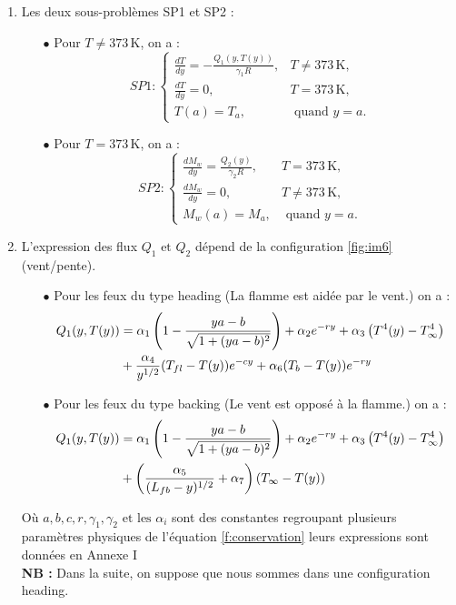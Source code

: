 \documentclass[12pt, oneside]{report} %
\theoremstyle{definition}
\theoremstyle{remark}
\begin{document}
\begin{enumerate}
		\item Les deux sous-problèmes SP1 et SP2 : 
\begin{itemize}
	\item[$\bullet$] Pour $T \neq 373\,\mathrm{K}$, on a : 
	\begin{equation}
		\label{SP1}
		SP1 : 
		\begin{cases}
			\frac{dT}{dy} = - \frac{Q_1(y, T(y))}{\gamma_1R}, & T\neq373\,\mathrm{K}, \\
			\frac{dT}{dy} = 0, & T = 373\,\mathrm{K},\\
			T(a) = T_{a}, & \text{ quand } y = a. 
		\end{cases}
	\end{equation}
		\item[$\bullet$] Pour $T = 373\,\mathrm{K}$, on a : 
		\begin{equation}
			\label{SP2}
			SP2 : 
			\begin{cases}
				\frac{dM_w}{dy} = \frac{Q_2(y)}{\gamma_2R}, & T = 373\,\mathrm{K}, \\
				\frac{dM_w}{dy} = 0, & T \neq 373\,\mathrm{K},\\
				M_w(a) = M_{a}, & \text{ quand } y = a. 
			\end{cases}
		\end{equation}
	\end{itemize}
	\item L'expression des flux $Q_1 \text{ et } Q_2$ dépend de la configuration \eqref{fig:im6} (vent/pente).
	\begin{itemize}
		\item[$\bullet$] Pour les feux du type heading (La flamme est aidée par le vent.) on a : 
		\begin{align}
			Q_1(y,T(y)) \notag&= \alpha_1 \left(1-\frac{ya-b}{\sqrt{1+(ya-b)^2}}\right) + \alpha_2e^{-ry}
			+ \alpha_3\left(T^4(y) - T_\infty^4\right)\\ & + \frac{\alpha_4}{y^{1/2}}(T_{fl} - T(y))e^{-cy} + \alpha_6(T_b-T(y))e^{-ry}
		\end{align}
		\item[$\bullet$] Pour les feux du type backing (Le vent est opposé à la flamme.) on a :
		\begin{align}
			Q_1(y,T(y)) \notag&= \alpha_1 \left(1-\frac{ya-b}{\sqrt{1+(ya-b)^2}}\right) + \alpha_2e^{-ry}
			+ \alpha_3\left(T^4(y) - T_\infty^4\right)\\ & + \left(\frac{\alpha_5}{(L_{fb}-y)^{1/2}}+ \alpha_7\right) 
			\left(T_\infty - T(y)\right)
		\end{align}
	\end{itemize}
Où  $a, b, c, r, \gamma_1, \gamma_2 \text{ et les } \alpha_i $ sont des constantes regroupant plusieurs paramètres physiques de l'équation \eqref{f:conservation} leurs expressions sont données en Annexe I \\
\textbf{NB : } Dans la suite, on suppose que nous sommes dans une configuration heading. 

\end{enumerate}
\end{document}
